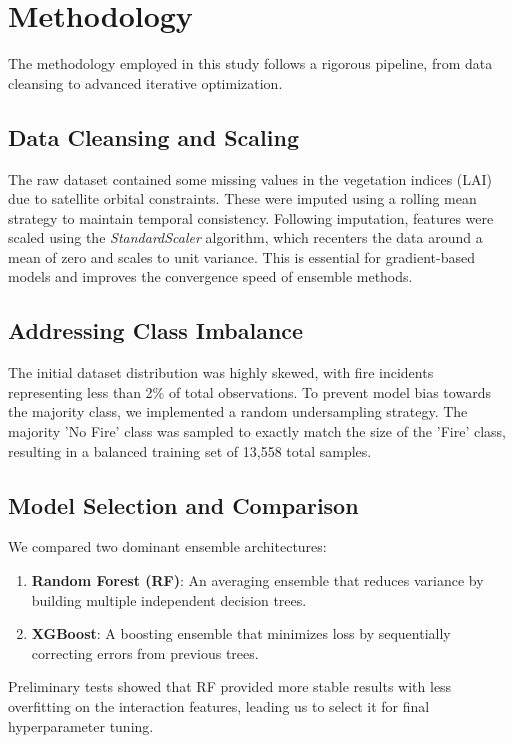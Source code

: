 \documentclass[conference]{IEEEtran}
\begin{document}
\section{Methodology}
The methodology employed in this study follows a rigorous pipeline, from data cleansing to advanced iterative optimization.

\subsection{Data Cleansing and Scaling}
The raw dataset contained some missing values in the vegetation indices (LAI) due to satellite orbital constraints. These were imputed using a rolling mean strategy to maintain temporal consistency. Following imputation, features were scaled using the \textit{StandardScaler} algorithm, which recenters the data around a mean of zero and scales to unit variance. This is essential for gradient-based models and improves the convergence speed of ensemble methods.

\subsection{Addressing Class Imbalance}
The initial dataset distribution was highly skewed, with fire incidents representing less than 2\% of total observations. To prevent model bias towards the majority class, we implemented a random undersampling strategy. The majority 'No Fire' class was sampled to exactly match the size of the 'Fire' class, resulting in a balanced training set of 13,558 total samples.

\subsection{Model Selection and Comparison}
We compared two dominant ensemble architectures:
\begin{enumerate}
    \item \textbf{Random Forest (RF)}: An averaging ensemble that reduces variance by building multiple independent decision trees.
    \item \textbf{XGBoost}: A boosting ensemble that minimizes loss by sequentially correcting errors from previous trees.
\end{enumerate}
Preliminary tests showed that RF provided more stable results with less overfitting on the interaction features, leading us to select it for final hyperparameter tuning.
\end{document}
